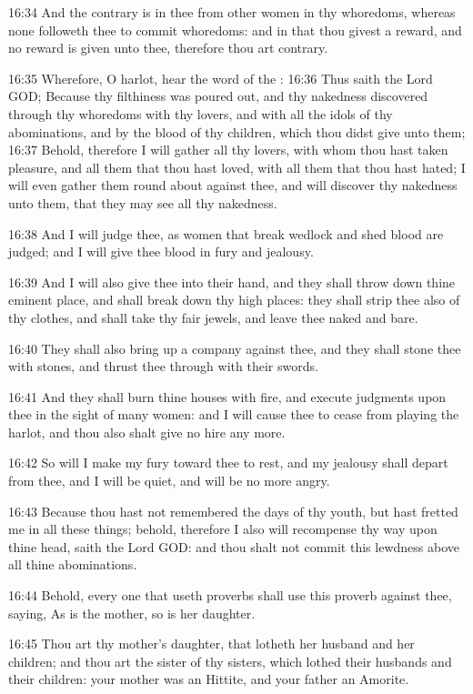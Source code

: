 16:34 And the contrary is in thee from other women in thy whoredoms, whereas none followeth thee to commit whoredoms: and in that thou givest a reward, and no reward is given unto thee, therefore thou art contrary.

16:35 Wherefore, O harlot, hear the word of the \LORD: 16:36 Thus saith the Lord GOD; Because thy filthiness was poured out, and thy nakedness discovered through thy whoredoms with thy lovers, and with all the idols of thy abominations, and by the blood of thy children, which thou didst give unto them; 16:37 Behold, therefore I will gather all thy lovers, with whom thou hast taken pleasure, and all them that thou hast loved, with all them that thou hast hated; I will even gather them round about against thee, and will discover thy nakedness unto them, that they may see all thy nakedness.

16:38 And I will judge thee, as women that break wedlock and shed blood are judged; and I will give thee blood in fury and jealousy.

16:39 And I will also give thee into their hand, and they shall throw down thine eminent place, and shall break down thy high places: they shall strip thee also of thy clothes, and shall take thy fair jewels, and leave thee naked and bare.

16:40 They shall also bring up a company against thee, and they shall stone thee with stones, and thrust thee through with their swords.

16:41 And they shall burn thine houses with fire, and execute judgments upon thee in the sight of many women: and I will cause thee to cease from playing the harlot, and thou also shalt give no hire any more.

16:42 So will I make my fury toward thee to rest, and my jealousy shall depart from thee, and I will be quiet, and will be no more angry.

16:43 Because thou hast not remembered the days of thy youth, but hast fretted me in all these things; behold, therefore I also will recompense thy way upon thine head, saith the Lord GOD: and thou shalt not commit this lewdness above all thine abominations.

16:44 Behold, every one that useth proverbs shall use this proverb against thee, saying, As is the mother, so is her daughter.

16:45 Thou art thy mother's daughter, that lotheth her husband and her children; and thou art the sister of thy sisters, which lothed their husbands and their children: your mother was an Hittite, and your father an Amorite.

